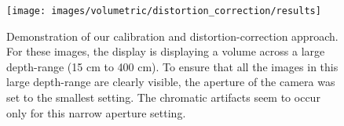 \begin{figure}[htb!]
\begin{center}
\texttt{[image: images/volumetric/distortion\_correction/results]}
\end{center}
\caption[Volumetric NED: Results of optical calibration and distortion correction]{Demonstration of our calibration and distortion-correction approach. For these images, the display is displaying a volume across a large depth-range (15 cm to 400 cm). To ensure that all the images in this large depth-range are clearly visible, the aperture of the camera was set to the smallest setting. The chromatic artifacts seem to occur only for this narrow aperture setting.}
\label{fig:volumetric:distortion_correction:results} 
\end{figure} 
